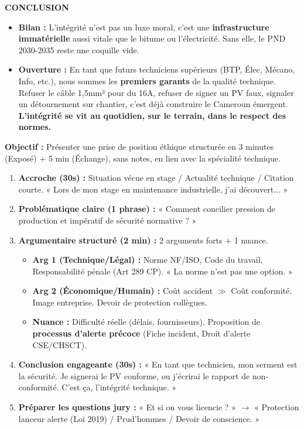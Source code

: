 \documentclass[11pt]{article}
\begin{document}
\begin{exoresolu}
    \textbf{CONCLUSION}
    \begin{itemize}
        \item \textbf{Bilan :} L'intégrité n'est pas un luxe moral, c'est une \textbf{infrastructure immatérielle} aussi vitale que le bitume ou l'électricité. Sans elle, le PND 2030-2035 reste une coquille vide.
        \item \textbf{Ouverture :} En tant que futurs techniciens supérieurs (BTP, Élec, Mécano, Info, etc.), nous sommes les \textbf{premiers garants} de la qualité technique. Refuser le câble 1,5mm² pour du 16A, refuser de signer un PV faux, signaler un détournement sur chantier, c'est déjà construire le Cameroun émergent. \textbf{L'intégrité se vit au quotidien, sur le terrain, dans le respect des normes.}
    \end{itemize}
\end{exoresolu}

\begin{methode}
    \textbf{Objectif :} Présenter une prise de position éthique structurée en 3 minutes (Exposé) + 5 min (Échange), sans notes, en lien avec la spécialité technique.
    \begin{enumerate}
        \item \textbf{Accroche (30s) :} Situation vécue en stage / Actualité technique / Citation courte. « Lors de mon stage en maintenance industrielle, j'ai découvert... »
        \item \textbf{Problématique claire (1 phrase) :} « Comment concilier pression de production et impératif de sécurité normative ? »
        \item \textbf{Argumentaire structuré (2 min) :} 2 arguments forts + 1 nuance.
            \begin{itemize}
                \item \textbf{Arg 1 (Technique/Légal) :} Norme NF/ISO, Code du travail, Responsabilité pénale (Art 289 CP). « La norme n'est pas une option. »
                \item \textbf{Arg 2 (Économique/Humain) :} Coût accident $\gg$ Coût conformité. Image entreprise. Devoir de protection collègues.
                \item \textbf{Nuance :} Difficulté réelle (délais, fournisseurs). Proposition de \textbf{processus d'alerte précoce} (Fiche incident, Droit d'alerte CSE/CHSCT).
            \end{itemize}
        \item \textbf{Conclusion engageante (30s) :} « En tant que technicien, mon serment est la sécurité. Je signerai le PV conforme, ou j'écrirai le rapport de non-conformité. C'est ça, l'intégrité technique. »
        \item \textbf{Préparer les questions jury :} « Et si on vous licencie ? » $\rightarrow$ « Protection lanceur alerte (Loi 2019) / Prud'hommes / Devoir de conscience. »
    \end{enumerate}
\end{methode}
\end{document}
